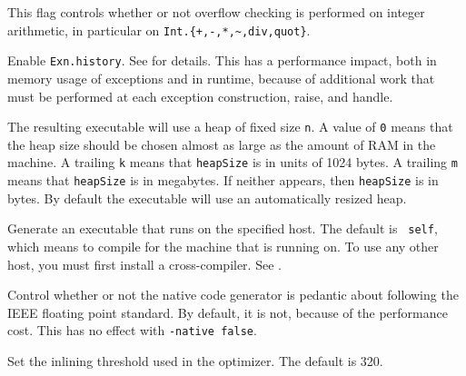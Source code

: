 \begin{description}

This flag controls whether or not overflow checking is performed on integer
arithmetic, in particular on {\tt Int.\{+,-,*,\~{},div,quot\}}.

%


Enable {\tt Exn.history}.  See  for details.  This has a
performance impact, both in memory usage of exceptions and in runtime,
because of additional work that must be performed at each exception
construction, raise, and handle.

The resulting executable will use a heap of fixed size {\tt n}.  A value
of {\tt 0} means that the heap size should be chosen almost as large as the
amount of
RAM in the machine.  A trailing {\tt k} means that {\tt heapSize} is in units of
1024 bytes.  A trailing {\tt m} means that {\tt heapSize} is in megabytes.  If
neither appears, then {\tt heapSize} is in bytes.  By default the executable
will use an automatically resized heap.

Generate an executable that runs on the specified host.  The default is {\tt
self}, which means to compile for the machine that {\mlton} is running on.  To
use any other host, you must first install a cross-compiler.  See
.

Control whether or not the native code generator is pedantic about following
the IEEE floating point standard.  By default, it is not, because of the
performance cost.  This has no effect with {\tt -native false}.


Set the inlining threshold used in the optimizer.  The default is 320.



\end{description}
